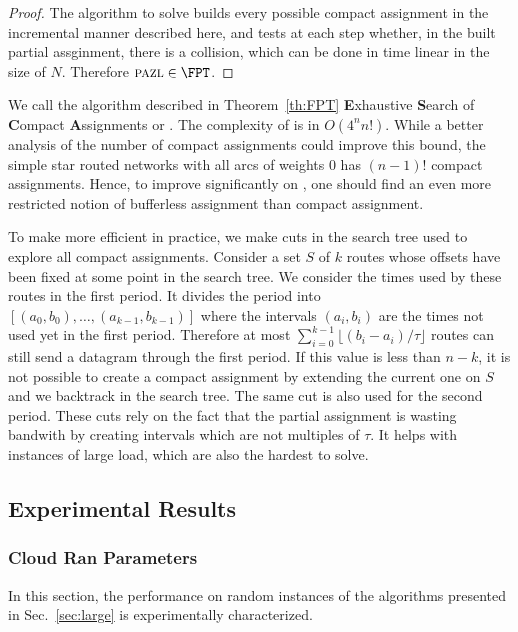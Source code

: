 \begin{proof}
The algorithm to solve \pma builds every possible compact assignment in the incremental manner described here, and tests at each step whether, in the built partial assginment, there is a collision, which can be done in time linear in the size of $N$. Therefore $\pma \in \FPT$.
\end{proof}


We call the algorithm described in Theorem~\ref{th:FPT} \textbf{E}xhaustive \textbf{S}earch of \textbf{C}ompact \textbf{A}ssignments or \ESCA. The complexity of \ESCA is in $O(4^n n!)$. While a better analysis of the number of compact assignments could improve this bound, the simple star routed networks with all arcs of weights $0$ has $(n-1)!$ compact assignments. Hence, to improve significantly on \ESCA, one should find an even more restricted notion of bufferless assignment than compact assignment.

To make \ESCA more efficient in practice, we make cuts in the search tree used to explore all compact assignments. Consider a set $S$ of $k$ routes whose offsets have been fixed at some point in the search tree. We consider the times used by these routes in the first period. It divides the period into $[(a_0,b_0), \dots, (a_{k-1},b_{k-1})]$ where the intervals $(a_i,b_i)$ are the times not used yet in the first period. Therefore at most $\displaystyle{ \sum_{i=0}^{k-1} \lfloor(b_{i} -a_i)/\tau\rfloor}$ routes can still send a datagram through the first period. If this value is less than $n - k$, it is not possible to create a compact assignment by extending the current one on $S$ and we backtrack in the search tree. The same cut is also used for the second period. These cuts rely on the fact that the partial assignment is wasting bandwith by creating intervals which are not multiples of $\tau$. It helps with instances of large load, which are also the hardest to solve.


\subsection{Experimental Results} \label{sec:perf_large}

\subsubsection{Cloud Ran Parameters}\label{sec:pazlcran}
In this section, the performance on random instances of the algorithms presented in Sec.~\ref{sec:large} is experimentally characterized.

